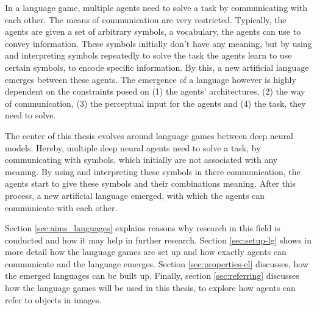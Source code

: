 In a language game, multiple agents need to solve a task by communicating with each other.
The means of communication are very restricted.
Typically, the agents are given a set of arbitrary symbols, a vocabulary, the agents can use to convey information.
These symbols initially don't have any meaning, but by using and interpreting symbols repeatedly to solve the task the agents learn to use certain symbols, to encode specific information.
By this, a new artificial language emerges between these agents.
The emergence of a language however is highly dependent on the constraints posed on (1) the agents' architectures, (2) the way of communication, (3) the perceptual input for the agents and (4) the task, they need to solve.




The center of this thesis evolves around language games between deep neural models.
Hereby, multiple deep neural agents need to solve a task, by communicating with symbols, which initially are not associated with any meaning.
By using and interpreting these symbols in there communication, the agents start to give these symbols and their combinations meaning.
After this process, a new artificial language emerged, with which the agents can communicate with each other.


Section \ref{sec:aims_languages} explains reasons why research in this field is conducted and how it may help in further research.
Section \ref{sec:setup-lg} shows in more detail how the language games are set up and how exactly agents can communicate and the language emerges.
Section \ref{sec:properties-el} discusses, how the emerged languages can be built up.
Finally, section \ref{sec:referring} discusses how the language games will be used in this thesis, to explore how agents can refer to objects in images.

